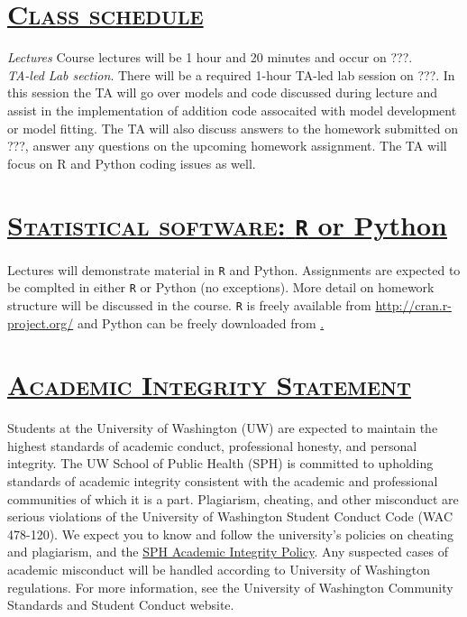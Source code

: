 \documentclass[fancyhdr,10pt]{article}
\begin{document}
\section*{\underline{\textsc{Class schedule}}}
\textit{Lectures} Course lectures will be 1 hour and 20 minutes and occur on ???.\\

\textit{TA-led Lab section}. There will be a required 1-hour TA-led lab session on ???. In this session the TA will go over models and code discussed during lecture and assist in the implementation of addition code assocaited with model development or model fitting. The TA will also discuss answers to the homework submitted on ???, answer any questions on the upcoming homework assignment. The TA will focus on R and Python coding issues as well.

\section*{\underline{\textsc{Statistical software:} \texttt{R} or Python}}
Lectures will demonstrate material in \verb!R! and Python. Assignments are expected to be complted in either \verb!R! or Python (no exceptions). More detail on homework structure will be discussed in the course. \verb!R! is freely available from \href{http://cran.r-project.org/}{http://cran.r-project.org/} and Python can be freely downloaded from \href{https://www.python.org/downloads/release/python-3100/}.

\section*{\underline{\textsc{Academic Integrity Statement}}}

Students at the University of Washington (UW) are expected to maintain the highest standards of academic conduct, professional honesty, and personal integrity. The UW School of Public Health (SPH) is committed to upholding standards of academic integrity consistent with the academic and professional communities of which it is a part. Plagiarism, cheating, and other misconduct are serious violations of the University of Washington Student Conduct Code (WAC 478-120). We expect you to know and follow the university's policies on cheating and plagiarism, and the \href{https://sph.washington.edu/students/academic-integrity-policy}{SPH Academic Integrity Policy}. Any suspected cases of academic misconduct will be handled according to University of Washington regulations. For more information, see the University of Washington Community Standards and Student Conduct website.
\end{document}

